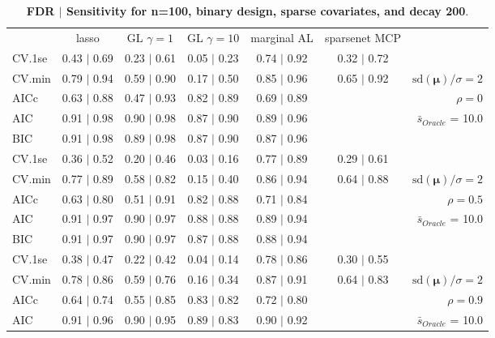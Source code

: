 \begin{table}\vspace{-.5cm}
\caption[l]{ {\it }
{ \bf FDR $\boldsymbol{\mid}$ Sensitivity for n=100, binary design, sparse covariates, and  decay  200}.}
\vspace{-.5cm}
\footnotesize{}
\begin{center}
\begin{tabular}{l*{5}{c}|r}
 & lasso & GL $\gamma=1$ & GL $\gamma=10$ & marginal AL & sparsenet MCP  & \\
 \cline{1-7}
CV.1se & 0.43 $\mid$ 0.69 & 0.23 $\mid$ 0.61 & 0.05 $\mid$ 0.23 & 0.74 $\mid$ 0.92 & 0.32 $\mid$ 0.72 & \\
CV.min & 0.79 $\mid$ 0.94 & 0.59 $\mid$ 0.90 & 0.17 $\mid$ 0.50 & 0.85 $\mid$ 0.96 & 0.65 $\mid$ 0.92 &  $\mathrm{sd}(\mathbf{\mu})/\sigma=2$ \\
AICc & 0.63 $\mid$ 0.88 & 0.47 $\mid$ 0.93 & 0.82 $\mid$ 0.89 & 0.69 $\mid$ 0.89 & & $\rho=0$ \\
AIC & 0.91 $\mid$ 0.98 & 0.90 $\mid$ 0.98 & 0.87 $\mid$ 0.90 & 0.89 $\mid$ 0.96 & &  \multirow{2}{*}{$\bar{s}_{Oracle}$ = 10.0} \\
BIC & 0.91 $\mid$ 0.98 & 0.89 $\mid$ 0.98 & 0.87 $\mid$ 0.90 & 0.87 $\mid$ 0.96 & &  \\
 \hline 
CV.1se & 0.36 $\mid$ 0.52 & 0.20 $\mid$ 0.46 & 0.03 $\mid$ 0.16 & 0.77 $\mid$ 0.89 & 0.29 $\mid$ 0.61 & \\
CV.min & 0.77 $\mid$ 0.89 & 0.58 $\mid$ 0.82 & 0.15 $\mid$ 0.40 & 0.86 $\mid$ 0.94 & 0.64 $\mid$ 0.88 &  $\mathrm{sd}(\mathbf{\mu})/\sigma=2$ \\
AICc & 0.63 $\mid$ 0.80 & 0.51 $\mid$ 0.91 & 0.82 $\mid$ 0.88 & 0.71 $\mid$ 0.84 & & $\rho=0.5$ \\
AIC & 0.91 $\mid$ 0.97 & 0.90 $\mid$ 0.97 & 0.88 $\mid$ 0.88 & 0.89 $\mid$ 0.94 & &  \multirow{2}{*}{$\bar{s}_{Oracle}$ = 10.0} \\
BIC & 0.91 $\mid$ 0.97 & 0.90 $\mid$ 0.97 & 0.87 $\mid$ 0.88 & 0.88 $\mid$ 0.94 & &  \\
 \hline 
CV.1se & 0.38 $\mid$ 0.47 & 0.22 $\mid$ 0.42 & 0.04 $\mid$ 0.14 & 0.78 $\mid$ 0.86 & 0.30 $\mid$ 0.55 & \\
CV.min & 0.78 $\mid$ 0.86 & 0.59 $\mid$ 0.76 & 0.16 $\mid$ 0.34 & 0.87 $\mid$ 0.91 & 0.64 $\mid$ 0.83 &  $\mathrm{sd}(\mathbf{\mu})/\sigma=2$ \\
AICc & 0.64 $\mid$ 0.74 & 0.55 $\mid$ 0.85 & 0.83 $\mid$ 0.82 & 0.72 $\mid$ 0.80 & & $\rho=0.9$ \\
AIC & 0.91 $\mid$ 0.96 & 0.90 $\mid$ 0.95 & 0.89 $\mid$ 0.83 & 0.90 $\mid$ 0.92 & &  \multirow{2}{*}{$\bar{s}_{Oracle}$ = 10.0} \\

\end{tabular}
\end{center}
\end{table}
